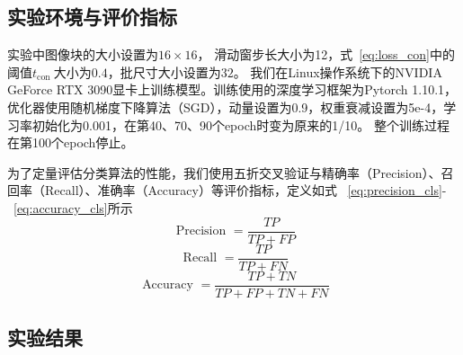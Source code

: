 \subsection{实验环境与评价指标}
实验中图像块的大小设置为$16 \times 16$，
滑动窗步长大小为12，式~\ref{eq:loss_con}中的阈值$t_{\text {con }}$大小为$0.4$，批尺寸大小设置为$32$。
我们在Linux操作系统下的NVIDIA GeForce RTX 3090显卡上训练模型。训练使用的深度学习框架为Pytorch 1.10.1，
优化器使用随机梯度下降算法（SGD），动量设置为0.9，权重衰减设置为5e-4，学习率初始化为0.001，在第40、70、90个epoch时变为原来的1/10。
整个训练过程在第100个epoch停止。

为了定量评估分类算法的性能，我们使用五折交叉验证与精确率（Precision）、召回率（Recall）、准确率（Accuracy）等评价指标，定义如式
~\ref{eq:precision_cls}-~\ref{eq:accuracy_cls}所示
\begin{equation}
  \text { Precision }=\frac{T P}{T P+F P}
  \label{eq:precision_cls}
\end{equation}
\begin{equation}
  \text { Recall }=\frac{T P}{T P+F N}
  \label{eq:recall_cls}
\end{equation}
\begin{equation}
  \text { Accuracy }=\frac{T P+T N}{T P+F P+T N+F N}
  \label{eq:accuracy_cls}
\end{equation}

\subsection{实验结果}

